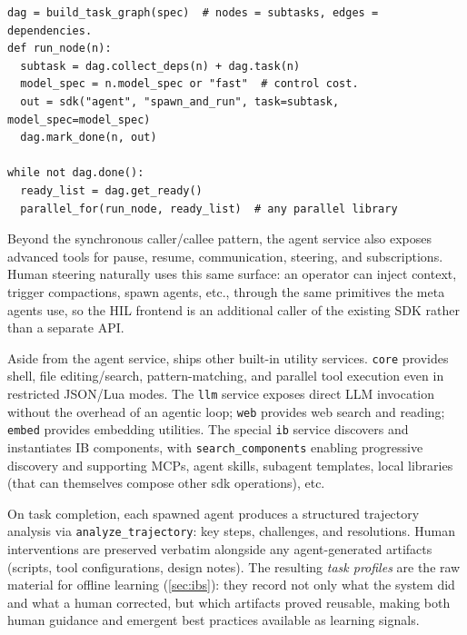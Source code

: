 \begin{listing}[t]
\begin{lstlisting}[morestring={[b]"},morecomment={[l]{\#}},morekeywords={def,while,not,or},keywordstyle=\color{accentPython}\bfseries,stringstyle=\color{synString},commentstyle=\color{synComment}]
dag = build_task_graph(spec)  # nodes = subtasks, edges = dependencies.
def run_node(n):
  subtask = dag.collect_deps(n) + dag.task(n)
  model_spec = n.model_spec or "fast"  # control cost.
  out = sdk("agent", "spawn_and_run", task=subtask, model_spec=model_spec)
  dag.mark_done(n, out)

while not dag.done():
  ready_list = dag.get_ready()
  parallel_for(run_node, ready_list)  # any parallel library
\end{lstlisting}
\caption{Coordination Example (Non-Interactive): parallel DAG execution over sub-agents with fine-grained cost control. Pipelines, hierarchical decomposition, etc. all reduce to similar code.}
\label{lst:dag}
\end{listing}

Beyond the synchronous caller/callee pattern, the agent service also exposes advanced tools for pause, resume, communication, steering, and subscriptions. Human steering naturally uses this same surface: an operator can inject context, trigger compactions, spawn agents, etc., through the same primitives the meta agents use, so the HIL frontend is an additional caller of the existing SDK rather than a separate API.

Aside from the agent service, \sysname ships other built-in utility services. \texttt{core} provides shell, file editing/search, pattern-matching, and parallel tool execution even in restricted JSON/Lua modes. The \texttt{llm} service exposes direct LLM invocation without the overhead of an agentic loop; \texttt{web} provides web search and reading; \texttt{embed} provides embedding utilities. The special \texttt{ib} service discovers and instantiates IB components, with \texttt{search\_components} enabling progressive discovery and supporting MCPs, agent skills, subagent templates, local libraries (that can themselves compose other sdk operations), etc.

\label{sec:profiles}
On task completion, each spawned agent produces a structured trajectory analysis via \texttt{analyze\_trajectory}: key steps, challenges, and resolutions. Human interventions are preserved verbatim alongside any agent-generated artifacts (scripts, tool configurations, design notes). The resulting \emph{task profiles} are the raw material for offline learning (\cref{sec:ibs}): they record not only what the system did and what a human corrected, but which artifacts proved reusable, making both human guidance and emergent best practices available as learning signals.

